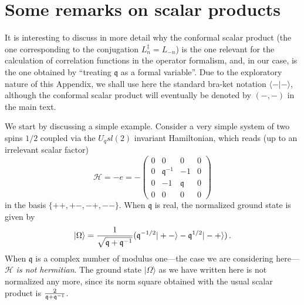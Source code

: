 \documentclass[a4paper,10pt]{article}
\newcommand{\q}{\mathfrak{q}}
\newcommand{\hubert}[1]{$\framebox{\tiny h}$\ \textbf{\texttt{{\color{blue}\footnotesize#1}}}}
\newcommand{\linnea}[1]{$\framebox{\tiny L}$\ \textbf{\texttt{{\color{red}\footnotesize#1}}}}
\newcommand{\jesper}[1]{$\framebox{\tiny J}$\ \textbf{\texttt{{\color{cyan}\footnotesize#1}}}}
\newcommand{\Hlatt}{\mathcal{H}}
\newcommand{\loopdagger}{\ddag}
\begin{document}
\appendix
\section{Some remarks on scalar products}\label{RemScalProd}




It is interesting to discuss in more detail why the conformal scalar product (the one corresponding to the conjugation $L_n^\loopdagger=L_{-n}$) is the one relevant for the calculation of correlation functions in the operator formalism, and, in our case, is the one obtained by ``treating $\q$ as a formal variable''. 
Due to the exploratory nature of this Appendix, we shall use here the standard bra-ket notation $\langle - | - \rangle$, although the conformal scalar product
will eventually be denoted by $(-,-)$ in the main text.

We start by discussing a simple example. Consider  a very simple system of two spins $1/2$ coupled via the $U_qsl(2)$ invariant Hamiltonian, which reads (up to an irrelevant scalar factor)
%
\begin{equation}
\Hlatt=-e=-\left(\begin{array}{cccc}
0&0&0&0\\
0&\q^{-1}&-1&0\\
0&-1&\q&0\\
0&0&0&0
\end{array}\right)
\end{equation}
%
in the basis $\{++,+-,-+,--\}$. When $\q$ is real, the normalized ground state is given by 
%
\begin{equation}
|\Omega\rangle={1\over \sqrt{\q+\q^{-1}}}(\q^{-1/2}|+-\rangle-\q^{1/2}|-+\rangle) \,.
\end{equation}
%
When $\q$ is a complex number of modulus one---the case we are considering here---$\Hlatt$ {\sl is not hermitian}.  The ground state $|\Omega\rangle$ as we have written here is not normalized any more, since its norm square obtained with the usual scalar product is ${2\over \q+\q^{-1}}$. 
 
\end{document}
